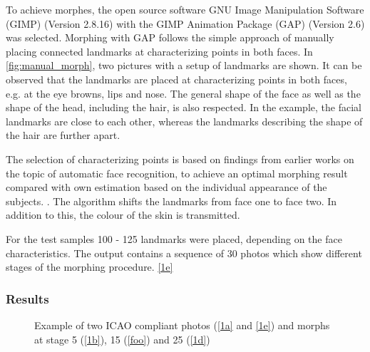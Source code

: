 To achieve morphes, the open source software GNU Image Manipulation Software (GIMP) (Version 2.8.16) with the GIMP Animation Package (GAP) (Version 2.6) was selected. Morphing with GAP follows the simple approach of manually placing connected landmarks at characterizing points in both faces. In \autoref{fig:manual_morph}, two pictures with a setup of landmarks are shown. It can be observed that the landmarks are placed at characterizing points in both faces, e.g. at the eye browns, lips and nose. The general shape of the face as well as the shape of the head, including the hair, is also respected. In the example, the facial landmarks are close to each other, whereas the landmarks describing the shape of the hair are further apart. 

The selection of characterizing points  is based on findings  from earlier works on the topic of automatic face recognition, to achieve an optimal morphing result compared with own estimation based on the individual appearance of the subjects. \cite[60ff]{jain2008handbook} \cite{amos2016openface}  .
The algorithm shifts the landmarks from face one to face two. In addition to this, the colour of the skin is transmitted. 

For the test samples 100 - 125 landmarks were placed, depending on the face characteristics. The output contains a sequence of 30 photos which show different stages of the morphing procedure. \ref{1e}


\subsubsection{Results}
\begin{figure}[h]
	\centering
	\hfill
	\hfill
	 \hfill
	\hfill
	\caption{Example of two ICAO compliant photos (\ref{1a} and \ref{1e}) and morphs at stage 5 (\ref{1b}), 15 (\ref{foo}) and 25 (\ref{1d})}
	\label{fig1} 
\end{figure}

